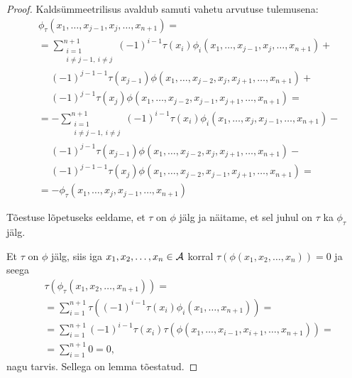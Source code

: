 \begin{proof}
    Kaldsümmeetrilisus avaldub samuti vahetu arvutuse tulemusena:
    \begin{align*}
        &\phi_\tau(
          x_1, \dots, x_{j-1}, x_j, \dots, x_{n+1}
        ) = \\
        &= \sum_{\substack{i=1\\i \ne j-1,\ i \ne j}}^{n+1}
          (-1)^{i-1} \tau(x_i) \phi_i(
              x_1, \dots, x_{j-1}, x_j, \dots, x_{n+1}
          ) + \\
        &\quad\ (-1)^{j-1-1} \tau(x_{j-1}) \phi(
              x_1, \dots, x_{j-2}, x_j, x_{j+1}, \dots, x_{n+1}
          ) + \\
        &\quad\ (-1)^{j-1} \tau(x_j) \phi(
              x_1, \dots, x_{j-2}, x_{j-1}, x_{j+1}, \dots, x_{n+1}
          ) = \\
        &= -\sum_{\substack{i=1\\i \ne j-1,\ i \ne j}}^{n+1}
          (-1)^{i-1} \tau(x_i) \phi_i(
              x_1, \dots, x_j, x_{j-1}, \dots, x_{n+1}
          ) - \\
        &\quad\ (-1)^{j-1} \tau(x_{j-1}) \phi(
              x_1, \dots, x_{j-2}, x_j, x_{j+1}, \dots, x_{n+1}
          ) - \\
        &\quad\ (-1)^{j-1-1} \tau(x_j) \phi(
              x_1, \dots, x_{j-2}, x_{j-1}, x_{j+1}, \dots, x_{n+1}
          ) = \\
        &= - \phi_\tau(
              x_1, \dots, x_j, x_{j-1}, \dots, x_{n+1}
            )
    \end{align*}

    Tõestuse lõpetuseks eeldame, et $\tau$ on $\phi$ jälg ja
    näitame, et sel juhul on $\tau$ ka $\phi_\tau$ jälg.

    Et $\tau$ on $\phi$ jälg, siis iga $x_1, x_2, \dots, x_n \in \mathcal{A}$
    korral $\tau(\phi(x_1, x_2, \dots, x_n)) = 0$ ja seega
    \begin{align*}
        &\tau(\phi_\tau(x_1, x_2, \dots, x_{n+1})) = \\
        &= \sum_{i=1}^{n+1} \tau \left(
            (-1)^{i-1} \tau(x_i) \phi_i(x_1, \dots, x_{n+1})
        \right) = \\
        &= \sum_{i=1}^{n+1} (-1)^{i-1} \tau(x_i) \tau \left(
            \phi(x_1, \dots, x_{i-1}, x_{i+1}, \dots, x_{n+1})
        \right) = \\
        &= \sum_{i=1}^{n+1} 0 = 0,
    \end{align*}
    nagu tarvis. Sellega on lemma tõestatud.
\end{proof}

